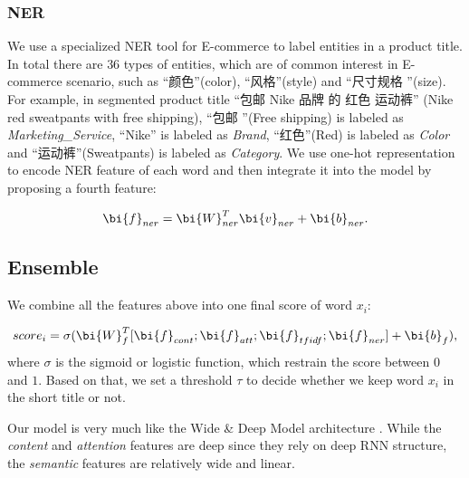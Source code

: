 \subsubsection{NER}   

We use a specialized NER tool for E-commerce to label entities in 
a product title. In total there are $36$ types of entities, which are of 
common interest in E-commerce scenario, such as ``颜色''(color), 
``风格''(style) and ``尺寸规格 ''(size).
For example, in segmented product title ``包邮 Nike 品牌 的 红色 运动裤'' 
(Nike red sweatpants with free shipping),
``包邮 ''(Free shipping) is labeled as \emph{Marketing\_Service},
``Nike'' is labeled as \emph{Brand}, ``红色''(Red) is labeled as \emph{Color}
and ``运动裤''(Sweatpants) is labeled as \emph{Category}.
We use one-hot representation to encode NER feature of each word and 
then integrate it into the model by proposing a fourth feature:

\begin{equation}
\label{eqn:ner}
\bi{f}_{ner} = \bi{W}_{ner}^T \bi{v}_{ner} + \bi{b}_{ner}.
\end{equation}

\subsection{Ensemble}
\label{sec:inference}
We combine all the features above into one final score of word $x_i$:

\begin{equation}
\label{eqn:ner}
score_i = \sigma(\bi{W}_{f}^T [\bi{f}_{cont};\bi{f}_{att};\bi{f}_{tfidf};\bi{f}_{ner}] + \bi{b}_{f}),
\end{equation}
where $\sigma$ is the sigmoid or logistic function, which restrain the score between $0$ and $1$. Based on that, we set a threshold $\tau$ to decide whether we keep word $x_i$ in the short title or not.

Our model is very much like the Wide \& Deep Model architecture \cite{cheng2016wide}.
While the \textit{content} and \textit{attention}  features are deep since they rely on deep RNN structure, the \textit{semantic} features are relatively wide and linear.



